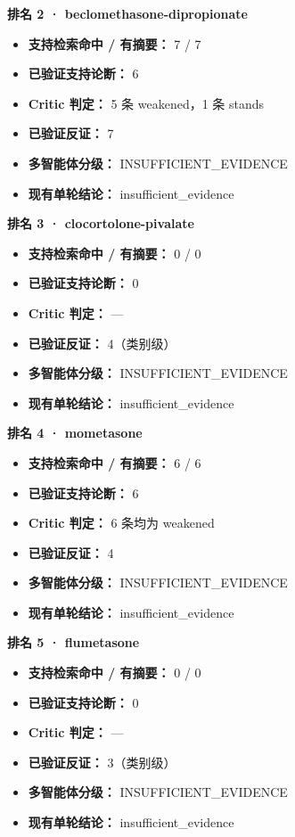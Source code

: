 \documentclass[
  10pt,
]{ctexart}
\providecommand{\tightlist}{%
  \setlength{\itemsep}{0pt}\setlength{\parskip}{0pt}}
\begin{document}
\textbf{排名 2 · beclomethasone-dipropionate}

\begin{itemize}
\tightlist
\item
  \textbf{支持检索命中 / 有摘要：} 7 / 7
\item
  \textbf{已验证支持论断：} 6
\item
  \textbf{Critic 判定：} 5 条 weakened，1 条 stands
\item
  \textbf{已验证反证：} 7
\item
  \textbf{多智能体分级：} INSUFFICIENT\_EVIDENCE
\item
  \textbf{现有单轮结论：} insufficient\_evidence
\end{itemize}

\textbf{排名 3 · clocortolone-pivalate}

\begin{itemize}
\tightlist
\item
  \textbf{支持检索命中 / 有摘要：} 0 / 0
\item
  \textbf{已验证支持论断：} 0
\item
  \textbf{Critic 判定：} ---
\item
  \textbf{已验证反证：} 4（类别级）
\item
  \textbf{多智能体分级：} INSUFFICIENT\_EVIDENCE
\item
  \textbf{现有单轮结论：} insufficient\_evidence
\end{itemize}

\textbf{排名 4 · mometasone}

\begin{itemize}
\tightlist
\item
  \textbf{支持检索命中 / 有摘要：} 6 / 6
\item
  \textbf{已验证支持论断：} 6
\item
  \textbf{Critic 判定：} 6 条均为 weakened
\item
  \textbf{已验证反证：} 4
\item
  \textbf{多智能体分级：} INSUFFICIENT\_EVIDENCE
\item
  \textbf{现有单轮结论：} insufficient\_evidence
\end{itemize}

\textbf{排名 5 · flumetasone}

\begin{itemize}
\tightlist
\item
  \textbf{支持检索命中 / 有摘要：} 0 / 0
\item
  \textbf{已验证支持论断：} 0
\item
  \textbf{Critic 判定：} ---
\item
  \textbf{已验证反证：} 3（类别级）
\item
  \textbf{多智能体分级：} INSUFFICIENT\_EVIDENCE
\item
  \textbf{现有单轮结论：} insufficient\_evidence
\end{itemize}
\end{document}
